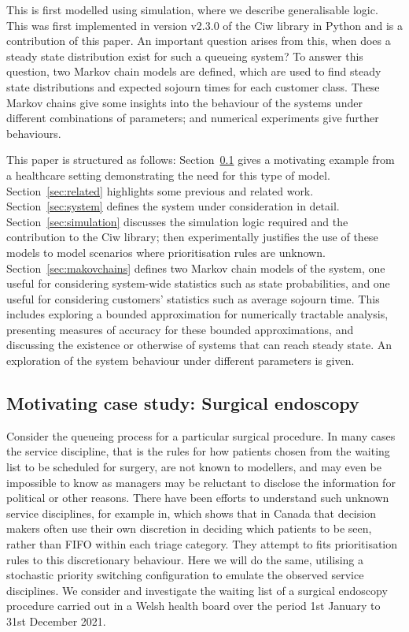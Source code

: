 \documentclass{article}
\begin{document}
This is first modelled using simulation, where we describe generalisable logic.
This was first implemented in version v2.3.0 of the Ciw library in Python
\cite{palmer19} and is a contribution of this paper.
An important question arises from this, when does a steady state distribution
exist for such a queueing system? To answer this question, two Markov chain
models are defined, which are used to find
steady state distributions and expected sojourn times for each customer class.
These Markov chains give some insights into the behaviour of the systems under
different combinations of parameters; and numerical experiments give further
behaviours.

This paper is structured as follows:
Section~\ref{sec:casestudy} gives a motivating example from a healthcare
setting demonstrating the need for this type of model.
Section~\ref{sec:related} highlights some previous and related work.
Section~\ref{sec:system} defines the system under consideration in detail.
Section~\ref{sec:simulation} discusses the simulation logic required and the
contribution to the Ciw library; then experimentally justifies the use of these
models to model scenarios where prioritisation rules are unknown.
Section~\ref{sec:makovchains} defines two Markov chain models of the system, one
useful for considering system-wide statistics such as state probabilities, and
one useful for considering customers' statistics such as average sojourn time.
This includes exploring a bounded approximation for numerically tractable
analysis, presenting measures of accuracy for these bounded approximations, and
discussing the existence or otherwise of systems that can reach steady state.
An exploration of the system behaviour under different parameters is given.

\subsection{Motivating case study: Surgical endoscopy}\label{sec:casestudy}
Consider the queueing process for a particular surgical procedure. In many cases
the service discipline, that is the rules for how patients chosen from the
waiting list to be scheduled for surgery, are not known to modellers, and may
even be impossible to know as managers may be reluctant to disclose the
information for political or other reasons.
There have been efforts to understand such unknown service disciplines, for
example in\cite{ding19}, which shows that in Canada that decision makers often
use their own discretion in deciding which patients to be seen, rather than
FIFO within each triage category. They attempt to fits prioritisation rules to
this discretionary behaviour. Here we will do the same, utilising a stochastic
priority switching configuration to emulate the observed service disciplines.
We consider and investigate the waiting list of a surgical endoscopy procedure
carried out in a Welsh health board over the period 1st January to 31st
December 2021.
\end{document}
